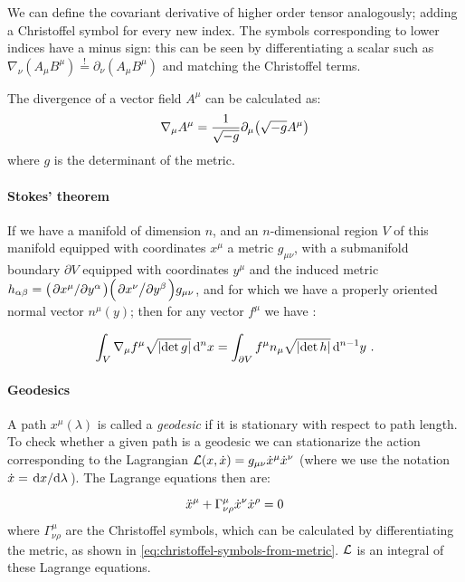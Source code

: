 \documentclass[main.tex]{subfiles}
\begin{document}
We can define the covariant derivative of higher order tensor analogously; adding a Christoffel symbol for every new index. The symbols corresponding to lower indices have a minus sign: this can be seen by differentiating a scalar such as \(\nabla_\nu (A_\mu B^\mu) \overset{!}{=}  \partial_\nu (A_\mu B^\mu)\) and matching the Christoffel terms.

The divergence of a vector field $A^\mu$ can be calculated as:
\begin{equation}
    \nabla_\mu A^\mu = \frac{1}{\sqrt{-g}}\partial_\mu \qty(\sqrt{-g}A^\mu) \label{eq:covariant-divergence}
\end{equation}
where $g$ is the determinant of the metric.

\paragraph{Stokes' theorem}

If we have a manifold of dimension \(n\), and an \(n\)-dimensional region \(V\) of this manifold equipped with coordinates \(x^\mu\) a metric \(g_{\mu\nu}\), with a submanifold boundary \(\partial V\) equipped with coordinates \(y^\mu\) and the induced metric \(h_{\alpha\beta} = \qty(\pdv*{x^\mu}{y^\alpha}) \qty(\pdv*{x^\nu}{y^\beta}) g_{\mu\nu}\), and for which we have a properly oriented normal vector \(n^\mu (y)\); then for any vector \(f^\mu\) we have \cite[]{Unger:2016}:

\begin{equation} \label{eq:stokes-theorem}
    \int _{V} \nabla_\mu f^\mu \sqrt{\abs{\det g}}  \dd[n]{x}  = \int _{\partial V} f^\mu  n_\mu \sqrt{\abs{\det h}} \dd[n-1]{y} \,.
\end{equation}

\paragraph{Geodesics}

A path $x^\mu(\lambda)$ is called a \emph{geodesic} if it is stationary with respect to path length.
To check whether a given path is a geodesic we can stationarize the action corresponding to the Lagrangian $\mathcal{L} (x, \Dot{x}) = g_{\mu\nu} \Dot{x}^\mu \Dot{x}^\nu$ (where we use the notation $\Dot{x} = \dv*{x}{\lambda}$). The Lagrange equations then are:

\begin{equation}
    \Ddot{x}^\mu + \Gamma^\mu_{\nu\rho} \Dot{x}^\nu \Dot{x}^\rho = 0
\end{equation}
where $\Gamma^\mu_{\nu \rho}$ are the Christoffel symbols, which can be calculated by differentiating the metric, as shown in \eqref{eq:christoffel-symbols-from-metric}. $\mathcal{L}$ is an integral of these Lagrange equations.
\end{document}

